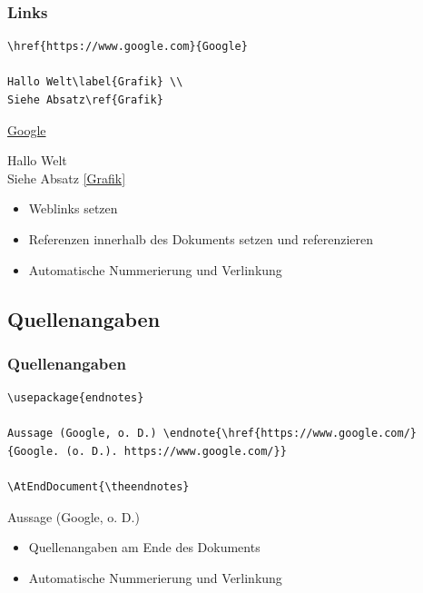 \documentclass[aspectratio=169]{beamer}
\begin{document}
\begin{frame}[fragile]
\frametitle{Links}

\begin{lstlisting}[language={[latex]TeX}]
\href{https://www.google.com}{Google}

Hallo Welt\label{Grafik} \\
Siehe Absatz\ref{Grafik}
\end{lstlisting}

\vspace{1em}

\href{https://www.google.com}{Google}

Hallo Welt\label{Grafik} \\
Siehe Absatz \ref{Grafik}

\vspace{1em}

\begin{itemize}
  \item Weblinks setzen
  \item Referenzen innerhalb des Dokuments setzen und referenzieren
  \item Automatische Nummerierung und Verlinkung
\end{itemize}

\end{frame}


\subsection{Quellenangaben}

\begin{frame}[fragile]

\frametitle{Quellenangaben}


\begin{lstlisting}[language={[latex]TeX}]
\usepackage{endnotes}

Aussage (Google, o. D.) \endnote{\href{https://www.google.com/}{Google. (o. D.). https://www.google.com/}}

\AtEndDocument{\theendnotes}
\end{lstlisting}

\vspace{1em}

Aussage (Google, o. D.) 

\vspace{1em}

\begin{itemize}
  \item Quellenangaben am Ende des Dokuments
  \item Automatische Nummerierung und Verlinkung
\end{itemize}

\end{frame}
\end{document}
